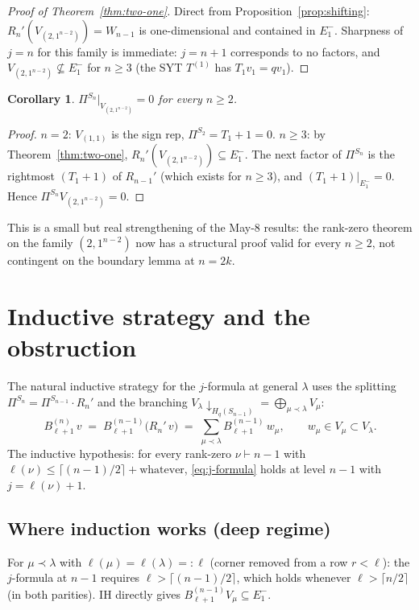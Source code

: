 \documentclass[11pt]{article}
\newtheorem{corollary}[theorem]{Corollary}
\theoremstyle{definition}
\begin{document}
\begin{proof}[Proof of Theorem~\ref{thm:two-one}]
Direct from Proposition~\ref{prop:shifting}: $R_n'(V_{(2,1^{n-2})})
=W_{n-1}$ is one-dimensional and contained in $E_1^-$.  Sharpness of
$j=n$ for this family is immediate: $j=n+1$ corresponds to no factors,
and $V_{(2,1^{n-2})}\not\subseteq E_1^-$ for $n\ge 3$ (the SYT
$T^{(1)}$ has $T_1v_1=qv_1$).
\end{proof}

\begin{corollary}\label{cor:21nm2-rank-zero}
$\Pi^{S_n}|_{V_{(2,1^{n-2})}}=0$ for every $n\ge 2$.
\end{corollary}

\begin{proof}
$n=2$: $V_{(1,1)}$ is the sign rep, $\Pi^{S_2}=T_1+1=0$.
$n\ge 3$: by Theorem~\ref{thm:two-one}, $R_n'(V_{(2,1^{n-2})})\subseteq
E_1^-$.  The next factor of $\Pi^{S_n}$ is the rightmost
$(T_1{+}1)$ of $R_{n-1}'$ (which exists for $n\ge 3$), and
$(T_1{+}1)|_{E_1^-}=0$.  Hence $\Pi^{S_n}V_{(2,1^{n-2})}=0$.
\end{proof}

This is a small but real strengthening of the May-8 results: the
rank-zero theorem on the family $(2,1^{n-2})$ now has a structural
proof valid for every $n\ge 2$, not contingent on the boundary lemma
at $n=2k$.

\section{Inductive strategy and the obstruction}

The natural inductive strategy for the $j$-formula at general
$\lambda$ uses the splitting $\Pi^{S_n}=\Pi^{S_{n-1}}\cdot R_n'$ and
the branching $V_\lambda{\downarrow}_{H_q(S_{n-1})}=\bigoplus_{\mu\prec\lambda}V_\mu$:
\[
   B_{\ell+1}^{(n)}\,v
   \;=\; B_{\ell+1}^{(n-1)}\bigl(R_n'\,v\bigr)
   \;=\; \sum_{\mu\prec\lambda} B_{\ell+1}^{(n-1)}\,w_\mu,
   \qquad w_\mu \in V_\mu\subset V_\lambda.
\]
The inductive hypothesis: for every rank-zero
$\nu\vdash n-1$ with $\ell(\nu)\le\lceil(n-1)/2\rceil+\text{whatever}$,
\eqref{eq:j-formula} holds at level $n-1$ with $j=\ell(\nu)+1$.

\subsection{Where induction works (deep regime)}

For $\mu\prec\lambda$ with $\ell(\mu)=\ell(\lambda)=:\ell$ (corner
removed from a row $r<\ell$): the $j$-formula at $n-1$ requires
$\ell>\lceil(n-1)/2\rceil$, which holds whenever
$\ell>\lceil n/2\rceil$ (in both parities).  IH directly gives
$B_{\ell+1}^{(n-1)}V_\mu\subseteq E_1^-$.
\end{document}
